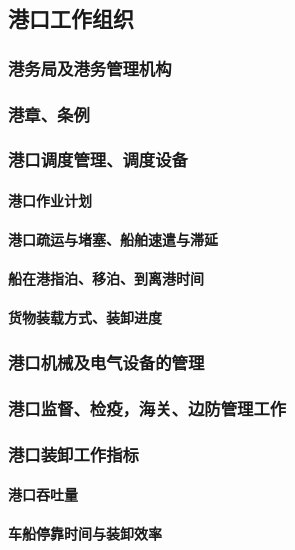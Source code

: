 \documentclass[UTF8]{../ApplicationUniverse}
\begin{document}
    \subsection{港口工作组织}
        \subsubsection{港务局及港务管理机构}
        \subsubsection{港章、条例}
        \subsubsection{港口调度管理、调度设备}
            \paragraph{港口作业计划}
            \paragraph{港口疏运与堵塞、船舶速遣与滞延}
            \paragraph{船在港指泊、移泊、到离港时间}
            \paragraph{货物装载方式、装卸进度}
        \subsubsection{港口机械及电气设备的管理}
        \subsubsection{港口监督、检疫，海关、边防管理工作}
        \subsubsection{港口装卸工作指标}
            \paragraph{港口吞吐量}
            \paragraph{车船停靠时间与装卸效率}
\end{document}
